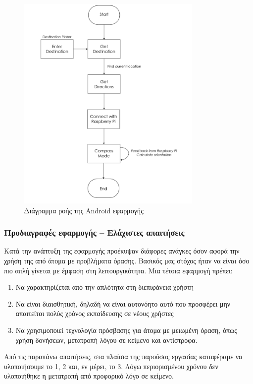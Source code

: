 \begin{figure}[H]
    \centering
    \includegraphics[width=0.8\textwidth]{images/working_diagram.png}
    \caption{Διάγραμμα ροής της Android εφαρμογής}
    \label{fig:working-diagram}
\end{figure}

\subsubsection{Προδιαγραφές εφαρμογής – Ελάχιστες απαιτήσεις}
Κατά την ανάπτυξη της εφαρμογής προέκυψαν διάφορες ανάγκες όσον αφορά την χρήση της από άτομα με προβλήματα όρασης. Βασικός μας στόχος ήταν να είναι όσο πιο απλή γίνεται με έμφαση στη λειτουργικότητα. Μια τέτοια εφαρμογή πρέπει:
\begin{enumerate}
    \item Να χαρακτηρίζεται από την απλότητα στη διεπιφάνεια χρήστη
    \item Να είναι διαισθητική, δηλαδή να είναι αυτονόητο αυτό που προσφέρει μην απαιτείται πολύς χρόνος εκπαίδευσης σε νέους χρήστες
    \item Να χρησιμοποιεί τεχνολογία πρόσβασης για άτομα με μειωμένη όραση, όπως χρήση δονήσεων, μετατροπή λόγου σε κείμενο και αντίστροφα.
\end{enumerate}

Από τις παραπάνω απαιτήσεις, στα πλαίσια της παρούσας εργασίας καταφέραμε να υλοποιήσουμε το 1, 2 και, εν μέρει, το 3. Λόγω περιορισμένου χρόνου δεν υλοποιήθηκε η μετατροπή από προφορικό λόγο σε κείμενο.
\newpage
